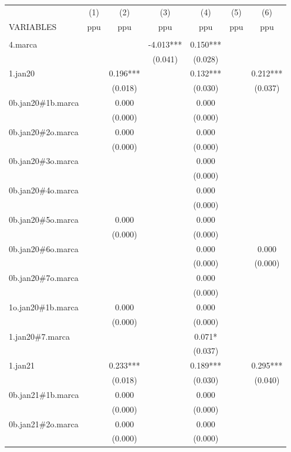 \begin{tabular}{lcccccc} \hline
 & (1) & (2) & (3) & (4) & (5) & (6) \\
VARIABLES & ppu & ppu & ppu & ppu & ppu & ppu \\ \hline
 &  &  &  &  &  &  \\
4.marca &  &  & -4.013*** & 0.150*** &  &  \\
 &  &  & (0.041) & (0.028) &  &  \\
1.jan20 &  & 0.196*** &  & 0.132*** &  & 0.212*** \\
 &  & (0.018) &  & (0.030) &  & (0.037) \\
0b.jan20\#1b.marca &  & 0.000 &  & 0.000 &  &  \\
 &  & (0.000) &  & (0.000) &  &  \\
0b.jan20\#2o.marca &  & 0.000 &  & 0.000 &  &  \\
 &  & (0.000) &  & (0.000) &  &  \\
0b.jan20\#3o.marca &  &  &  & 0.000 &  &  \\
 &  &  &  & (0.000) &  &  \\
0b.jan20\#4o.marca &  &  &  & 0.000 &  &  \\
 &  &  &  & (0.000) &  &  \\
0b.jan20\#5o.marca &  & 0.000 &  & 0.000 &  &  \\
 &  & (0.000) &  & (0.000) &  &  \\
0b.jan20\#6o.marca &  &  &  & 0.000 &  & 0.000 \\
 &  &  &  & (0.000) &  & (0.000) \\
0b.jan20\#7o.marca &  &  &  & 0.000 &  &  \\
 &  &  &  & (0.000) &  &  \\
1o.jan20\#1b.marca &  & 0.000 &  & 0.000 &  &  \\
 &  & (0.000) &  & (0.000) &  &  \\
1.jan20\#7.marca &  &  &  & 0.071* &  &  \\
 &  &  &  & (0.037) &  &  \\
1.jan21 &  & 0.233*** &  & 0.189*** &  & 0.295*** \\
 &  & (0.018) &  & (0.030) &  & (0.040) \\
0b.jan21\#1b.marca &  & 0.000 &  & 0.000 &  &  \\
 &  & (0.000) &  & (0.000) &  &  \\
0b.jan21\#2o.marca &  & 0.000 &  & 0.000 &  &  \\
 &  & (0.000) &  & (0.000) &  &  \\

\end{tabular}
